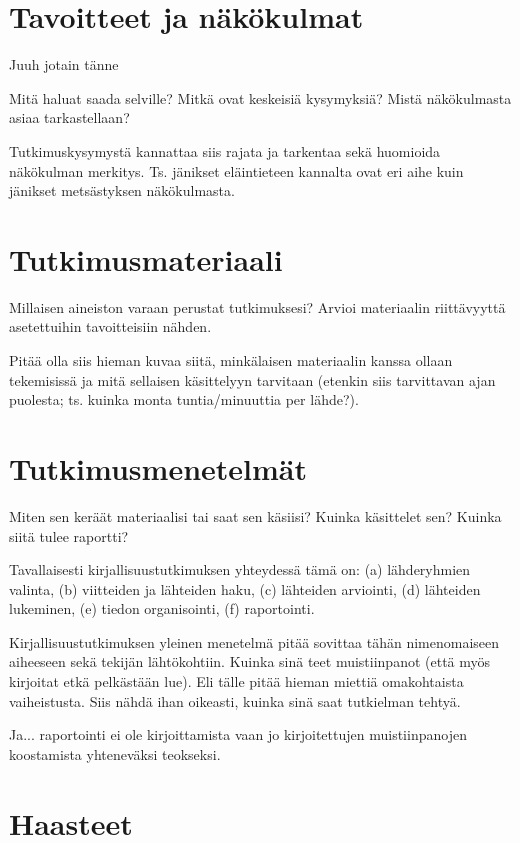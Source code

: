 \documentclass[12pt,a4paper,finnish,oneside]{article}
\begin{document}
\section{Tavoitteet ja näkökulmat}

Juuh jotain tänne

Mitä haluat saada selville? Mitkä ovat keskeisiä kysymyksiä? Mistä
näkökulmasta asiaa tarkastellaan?

Tutkimuskysymystä kannattaa siis rajata ja tarkentaa sekä huomioida
näkökulman merkitys. Ts. jänikset eläintieteen kannalta ovat eri aihe
kuin jänikset metsästyksen näkökulmasta.

\section{Tutkimusmateriaali}

Millaisen aineiston varaan perustat tutkimuksesi? Arvioi materiaalin
riittävyyttä asetettuihin tavoitteisiin nähden.

Pitää olla siis hieman kuvaa siitä, minkälaisen materiaalin kanssa
ollaan tekemisissä ja mitä sellaisen käsittelyyn tarvitaan (etenkin
siis tarvittavan ajan puolesta; ts. kuinka monta tuntia/minuuttia per
lähde?).

\section{Tutkimusmenetelmät}

Miten sen keräät materiaalisi tai saat sen käsiisi? Kuinka käsittelet
sen? Kuinka siitä tulee raportti?

Tavallaisesti kirjallisuustutkimuksen yhteydessä tämä on:
(a) lähderyhmien valinta,
(b) viitteiden ja lähteiden haku,
(c) lähteiden arviointi,
(d) lähteiden lukeminen,
(e) tiedon organisointi,
(f) raportointi.  %

Kirjallisuustutkimuksen yleinen menetelmä pitää sovittaa tähän
nimenomaiseen aiheeseen sekä tekijän lähtökohtiin. Kuinka sinä teet
muistiinpanot (että myös kirjoitat etkä pelkästään lue). Eli tälle
pitää hieman miettiä omakohtaista vaiheistusta. Siis nähdä ihan
oikeasti, kuinka sinä saat tutkielman tehtyä.

Ja... raportointi ei ole kirjoittamista vaan jo kirjoitettujen
muistiinpanojen koostamista yhteneväksi teokseksi.

\section{Haasteet}
\end{document}

